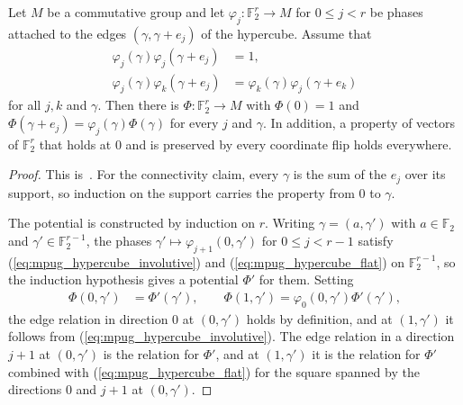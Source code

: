 \begin{lemma}
    \label{thm:mpug_hypercube_potential}
    \leanok
    Let $M$ be a commutative group and let
    $\varphi_j\colon\mathbb F_2^r\to M$ for $0\leq j<r$ be phases attached
    to the edges $(\gamma,\gamma+e_j)$ of the hypercube. Assume that
    \begin{align}
        \varphi_j(\gamma)\varphi_j(\gamma+e_j)
         & =1,
        \label{eq:mpug_hypercube_involutive}       \\
        \varphi_j(\gamma)\varphi_k(\gamma+e_j)
         & =\varphi_k(\gamma)\varphi_j(\gamma+e_k)
        \label{eq:mpug_hypercube_flat}
    \end{align}
    for all $j,k$ and $\gamma$. Then there is $\Phi\colon\mathbb F_2^r\to M$
    with $\Phi(0)=1$ and $\Phi(\gamma+e_j)=\varphi_j(\gamma)\Phi(\gamma)$ for
    every $j$ and $\gamma$. In addition, a property of vectors of
    $\mathbb F_2^r$ that holds at $0$ and is preserved by every coordinate
    flip holds everywhere.
\end{lemma}

\begin{proof}\leanok
    This is~\cite[``Flat phases on the hypercube have a
        potential'']{QICLean2026Blueprint}.
    For the connectivity claim, every $\gamma$ is the sum of the $e_j$ over
    its support, so induction on the support carries the property from $0$ to
    $\gamma$.

    The potential is constructed by induction on $r$. Writing
    $\gamma=(a,\gamma')$ with $a\in\mathbb F_2$ and
    $\gamma'\in\mathbb F_2^{r-1}$, the phases
    $\gamma'\mapsto\varphi_{j+1}(0,\gamma')$ for $0\leq j<r-1$ satisfy
    (\ref{eq:mpug_hypercube_involutive}) and (\ref{eq:mpug_hypercube_flat})
    on $\mathbb F_2^{r-1}$, so the induction hypothesis gives a potential
    $\Phi'$ for them. Setting
    \begin{align}
        \Phi(0,\gamma') & =\Phi'(\gamma'),
        \qquad
        \Phi(1,\gamma')=\varphi_0(0,\gamma')\Phi'(\gamma'),
        \label{eq:mpug_hypercube_potential_step}
    \end{align}
    the edge relation in direction $0$ at $(0,\gamma')$ holds by definition,
    and at $(1,\gamma')$ it follows from
    (\ref{eq:mpug_hypercube_involutive}). The edge relation in a direction
    $j+1$ at $(0,\gamma')$ is the relation for $\Phi'$, and at $(1,\gamma')$
    it is the relation for $\Phi'$ combined with
    (\ref{eq:mpug_hypercube_flat}) for the square spanned by the directions
    $0$ and $j+1$ at $(0,\gamma')$.
\end{proof}

